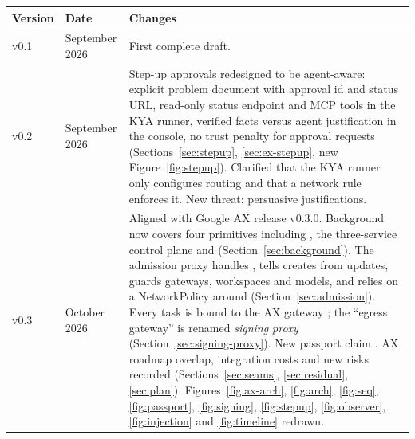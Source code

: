 \begin{center}
\small
\begin{tabularx}{\linewidth}{@{}lL{2.6cm}Y@{}}
\toprule
\textbf{Version} & \textbf{Date} & \textbf{Changes}\\
\midrule
v0.1 & September 2026 & First complete draft.\\
v0.2 & September 2026 & Step-up approvals redesigned to be agent-aware: explicit problem document with approval id and status URL, read-only status endpoint and MCP tools in the KYA runner, verified facts versus agent justification in the console, no trust penalty for approval requests (Sections~\ref{sec:stepup}, \ref{sec:ex-stepup}, new Figure~\ref{fig:stepup}). Clarified that the KYA runner only configures routing and that a network rule enforces it. New threat: persuasive justifications.\\
v0.3 & October 2026 & Aligned with Google AX release v0.3.0. Background now covers four primitives including , the three-service control plane and  (Section~\ref{sec:background}). The admission proxy handles , tells creates from updates, guards gateways, workspaces and models, and relies on a NetworkPolicy around  (Section~\ref{sec:admission}). Every task is bound to the AX gateway ; the ``egress gateway'' is renamed \emph{signing proxy} (Section~\ref{sec:signing-proxy}). New passport claim . AX roadmap overlap, integration costs and new risks recorded (Sections~\ref{sec:seams}, \ref{sec:residual}, \ref{sec:plan}). Figures~\ref{fig:ax-arch}, \ref{fig:arch}, \ref{fig:seq}, \ref{fig:passport}, \ref{fig:signing}, \ref{fig:stepup}, \ref{fig:observer}, \ref{fig:injection} and \ref{fig:timeline} redrawn.\\
\bottomrule
\end{tabularx}
\end{center}
